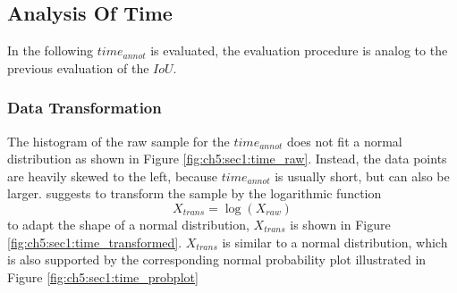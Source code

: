 \subsection{Analysis Of Time}\label{ord:ch5:sec1:subsec3}
In the following $time_{annot}$ is evaluated, the evaluation procedure is analog to the previous evaluation of the $IoU$.

\subsubsection{Data Transformation}

The histogram of the raw sample for the $time_{annot}$ does not fit a normal distribution as shown in Figure \ref{fig:ch5:sec1:time_raw}.
Instead, the data points are heavily skewed to the left, because $time_{annot}$ is usually short, but can also be larger.
\cite{PS16-Statistics} suggests to transform the sample by the logarithmic function 
\begin{equation} \label{equ:trans_time}
	X_{trans} = \log \left( X_{raw} \right) 
\end{equation}
to adapt the shape of a normal distribution, $X_{trans}$ is shown in Figure \ref{fig:ch5:sec1:time_transformed}.
$X_{trans}$ is similar to a normal distribution, which is also supported by the corresponding normal probability plot illustrated in Figure \ref{fig:ch5:sec1:time_probplot}

